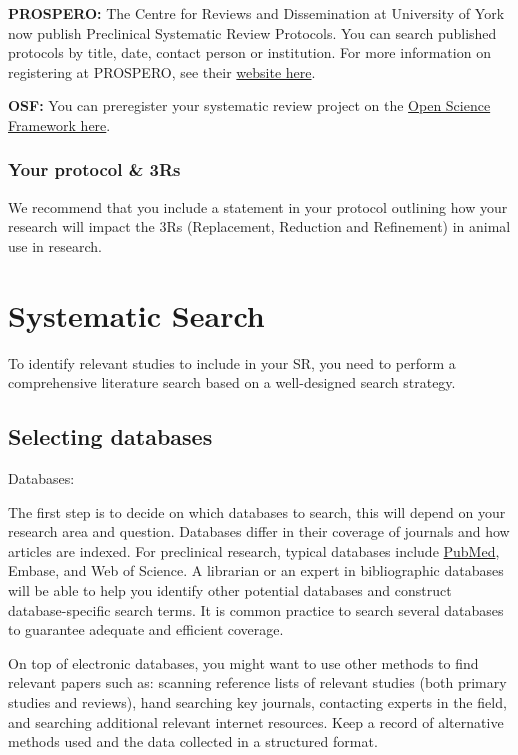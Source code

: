 \documentclass[
]{book}
\begin{document}
\textbf{PROSPERO:}
The Centre for Reviews and Dissemination at University of York now publish Preclinical Systematic Review Protocols. You can search published protocols by title, date, contact person or institution.
For more information on registering at PROSPERO, see their \href{https://www.crd.york.ac.uk/prospero/}{website here}.

\textbf{OSF:}
You can preregister your systematic review project on the \href{https://osf.io/prereg/}{Open Science Framework here}.

\hypertarget{your-protocol-3rs}{%
\subsection{Your protocol \& 3Rs}\label{your-protocol-3rs}}

We recommend that you include a statement in your protocol outlining how your research will impact the 3Rs (Replacement, Reduction and Refinement) in animal use in research.

\hypertarget{systematic-search}{%
\chapter{Systematic Search}\label{systematic-search}}

To identify relevant studies to include in your SR, you need to perform a comprehensive literature search based on a well-designed search strategy.

\hypertarget{selecting-databases}{%
\section{Selecting databases}\label{selecting-databases}}

Databases:

The first step is to decide on which databases to search, this will depend on your research area and question. Databases differ in their coverage of journals and how articles are indexed. For preclinical research, typical databases include \href{https://pubmed.ncbi.nlm.nih.gov/}{PubMed}, Embase, and Web of Science. A librarian or an expert in bibliographic databases will be able to help you identify other potential databases and construct database-specific search terms. It is common practice to search several databases to guarantee adequate and efficient coverage.

On top of electronic databases, you might want to use other methods to find relevant papers such as: scanning reference lists of relevant studies (both primary studies and reviews), hand searching key journals, contacting experts in the field, and searching additional relevant internet resources. Keep a record of alternative methods used and the data collected in a structured format.
\end{document}
